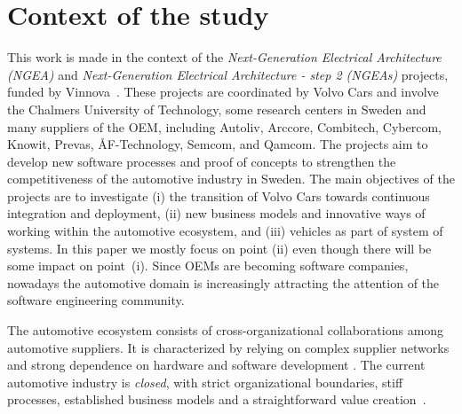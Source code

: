 \section{Context of the study}\label{sec:context}


This work is made in the context of the {\em Next-Generation Electrical Architecture (NGEA)} and {\em Next-Generation Electrical Architecture - step 2 (NGEAs)} projects, funded by Vinnova~\cite{Vinnova}. 
These projects are coordinated by Volvo Cars and involve the Chalmers University of Technology, some research centers in Sweden and many suppliers of the OEM, including Autoliv, Arccore, Combitech, Cybercom, Knowit, Prevas, \AA F-Technology, Semcom, and Qamcom. The projects aim to develop new software processes and proof of concepts to strengthen the competitiveness of the automotive industry in Sweden. The main objectives of the projects are to investigate (i) the transition of Volvo Cars towards continuous integration and deployment, (ii) new business models and innovative ways of working within the automotive ecosystem, and (iii) vehicles as part of system of systems. 
In this paper we mostly focus on point (ii) even though there will be some impact on point~(i). Since OEMs are becoming software companies, nowadays the automotive domain is increasingly attracting the attention of the software engineering community.  

The automotive ecosystem consists of cross-organizational collaborations among automotive suppliers. It is characterized by relying on complex supplier networks and strong dependence on hardware and software development \cite{Knauss14d.:towards,Broy:2006:CAS:1134285.1134292}.
The current automotive industry is {\em closed}, with strict organizational boundaries, stiff processes, established business models and a straightforward value creation~\cite{ConnectedVehicle2012}.


